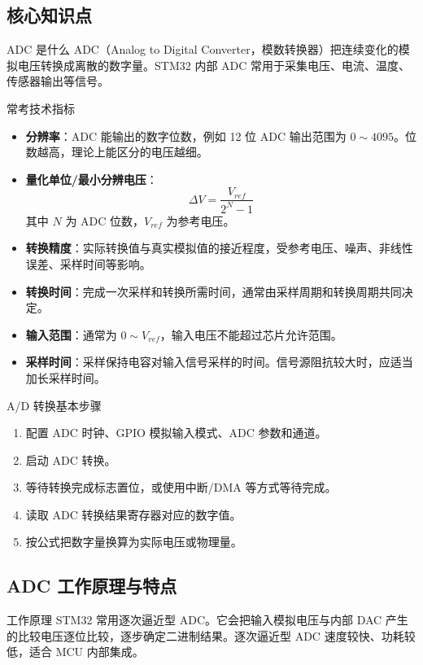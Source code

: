 \documentclass[UTF8,fontset=none,12pt]{ctexart}
\begin{document}
\subsection{核心知识点}
\begin{pointbox}{ADC 是什么}
ADC（Analog to Digital Converter，模数转换器）把连续变化的模拟电压转换成离散的数字量。STM32 内部 ADC 常用于采集电压、电流、温度、传感器输出等信号。
\end{pointbox}

\begin{pointbox}{常考技术指标}
\begin{itemize}
  \item \textbf{分辨率}：ADC 能输出的数字位数，例如 12 位 ADC 输出范围为 $0\sim 4095$。位数越高，理论上能区分的电压越细。
  \item \textbf{量化单位/最小分辨电压}：
  \[
    \Delta V=\frac{V_{ref}}{2^N-1}
  \]
  其中 $N$ 为 ADC 位数，$V_{ref}$ 为参考电压。
  \item \textbf{转换精度}：实际转换值与真实模拟值的接近程度，受参考电压、噪声、非线性误差、采样时间等影响。
  \item \textbf{转换时间}：完成一次采样和转换所需时间，通常由采样周期和转换周期共同决定。
  \item \textbf{输入范围}：通常为 $0\sim V_{ref}$，输入电压不能超过芯片允许范围。
  \item \textbf{采样时间}：采样保持电容对输入信号采样的时间。信号源阻抗较大时，应适当加长采样时间。
\end{itemize}
\end{pointbox}

\begin{pointbox}{A/D 转换基本步骤}
\begin{enumerate}
  \item 配置 ADC 时钟、GPIO 模拟输入模式、ADC 参数和通道。
  \item 启动 ADC 转换。
  \item 等待转换完成标志置位，或使用中断/DMA 等方式等待完成。
  \item 读取 ADC 转换结果寄存器对应的数字值。
  \item 按公式把数字量换算为实际电压或物理量。
\end{enumerate}
\end{pointbox}

\subsection{ADC 工作原理与特点}
\begin{pointbox}{工作原理}
STM32 常用逐次逼近型 ADC。它会把输入模拟电压与内部 DAC 产生的比较电压逐位比较，逐步确定二进制结果。逐次逼近型 ADC 速度较快、功耗较低，适合 MCU 内部集成。
\end{pointbox}
\end{document}
